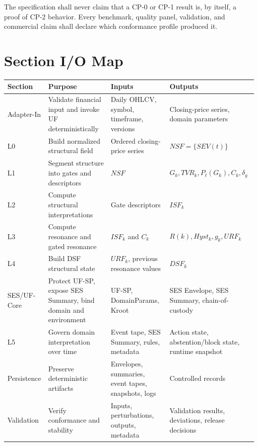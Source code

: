 The specification shall never claim that a CP-0 or CP-1 result is, by itself, a proof of CP-2 behavior. Every benchmark, quality panel, validation, and commercial claim shall declare which conformance profile produced it.

\section{Section I/O Map}
\begin{longtable}{p{}p{}p{}p{}}
\toprule
Section & Purpose & Inputs & Outputs \\
\midrule
Adapter-In & Validate financial input and invoke UF deterministically & Daily OHLCV, symbol, timeframe, versions & Closing-price series, domain parameters \\
L0 & Build normalized structural field & Ordered closing-price series & $NSF=\{SEV(t)\}$ \\
L1 & Segment structure into gates and descriptors & $NSF$ & $G_k,TVR_k,P_\ell(G_k),C_k,\delta_g$ \\
L2 & Compute structural interpretations & Gate descriptors & $ISF_k$ \\
L3 & Compute resonance and gated resonance & $ISF_k$ and $C_k$ & $R(k),Hyst_k,g_k,URF_k$ \\
L4 & Build DSF structural state & $URF_k$, previous resonance values & $DSF_k$ \\
SES/UF-Core & Protect UF-SP, expose SES Summary, bind domain and environment & UF-SP, DomainParams, Kroot & SES Envelope, SES Summary, chain-of-custody \\
L5 & Govern domain interpretation over time & Event tape, SES Summary, rules, metadata & Action state, abstention/block state, runtime snapshot \\
Persistence & Preserve deterministic artifacts & Envelopes, summaries, event tapes, snapshots, logs & Controlled records \\
Validation & Verify conformance and stability & Inputs, perturbations, outputs, metadata & Validation results, deviations, release decisions \\
\bottomrule
\end{longtable}
